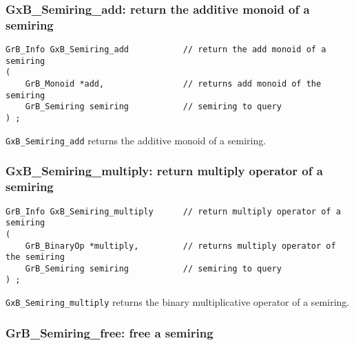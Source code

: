 \documentclass[12pt]{article}
\begin{document}
{%
\subsubsection{{\sf GxB\_Semiring\_add:} return the additive monoid of a semiring}
\label{semiring_add}

\begin{mdframed}[userdefinedwidth=6in]
{\footnotesize
\begin{verbatim}
GrB_Info GxB_Semiring_add           // return the add monoid of a semiring
(
    GrB_Monoid *add,                // returns add monoid of the semiring
    GrB_Semiring semiring           // semiring to query
) ;
\end{verbatim}
} \end{mdframed}

\verb'GxB_Semiring_add' returns the additive monoid of a semiring.

\subsubsection{{\sf GxB\_Semiring\_multiply:} return multiply operator of a semiring}
\label{semiring_multiply}

\begin{mdframed}[userdefinedwidth=6in]
{\footnotesize
\begin{verbatim}
GrB_Info GxB_Semiring_multiply      // return multiply operator of a semiring
(
    GrB_BinaryOp *multiply,         // returns multiply operator of the semiring
    GrB_Semiring semiring           // semiring to query
) ;
\end{verbatim}
} \end{mdframed}

\verb'GxB_Semiring_multiply' returns the binary multiplicative operator of a
semiring.

\subsubsection{{\sf GrB\_Semiring\_free:} free a semiring}
\label{semiring_free}

}
\end{document}
